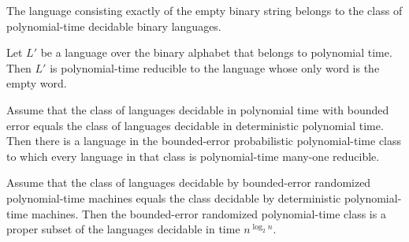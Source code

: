 \begin{theorem}
\label{Randomized.emptyWordLang_mem_P}
\leanok
{}
The language consisting exactly of the empty binary string belongs to the class of
polynomial-time decidable binary languages.
\end{theorem}

\begin{theorem}
\label{Randomized.polyTimeReducible_emptyWordLang}
\leanok
{}
Let $L'$ be a language over the binary alphabet that belongs to polynomial time. Then
$L'$ is polynomial-time reducible to the language whose only word is the empty word.
\end{theorem}

\begin{theorem}
\label{Randomized.exists_BPPHard_mem_BPP_PTM_of_eq_P}
\leanok
{}
Assume that the class of languages decidable in polynomial time with bounded error
equals the class of languages decidable in deterministic polynomial time. Then there is
a language in the bounded-error probabilistic polynomial-time class to which every
language in that class is polynomial-time many-one reducible.
\end{theorem}

\begin{theorem}
\label{Randomized.BPP_PTM_ssubset_DTIME_pow_log_of_eq_P}
\leanok
{}
Assume that the class of languages decidable by bounded-error randomized polynomial-time
machines equals the class decidable by deterministic polynomial-time machines. Then the
bounded-error randomized polynomial-time class is a proper subset of the languages
decidable in time $n^{\log_2 n}$.
\end{theorem}
